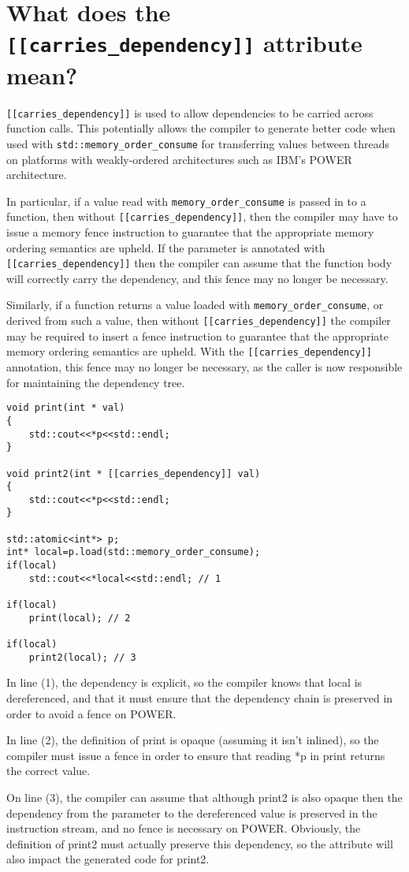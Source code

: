 \section{What does the \texttt{[[carries_dependency]]} attribute mean?}

\texttt{[[carries_dependency]]} is used to allow dependencies to be carried across function calls. This potentially allows the compiler to generate better code when used with \texttt{std::memory_order_consume} for transferring values between threads on platforms with weakly-ordered architectures such as IBM's POWER architecture.

In particular, if a value read with \texttt{memory_order_consume} is passed in to a function, then without \texttt{[[carries_dependency]]}, then the compiler may have to issue a memory fence instruction to guarantee that the appropriate memory ordering semantics are upheld. If the parameter is annotated with \texttt{[[carries_dependency]]} then the compiler can assume that the function body will correctly carry the dependency, and this fence may no longer be necessary.

Similarly, if a function returns a value loaded with \texttt{memory_order_consume}, or derived from such a value, then without \texttt{[[carries_dependency]]} the compiler may be required to insert a fence instruction to guarantee that the appropriate memory ordering semantics are upheld. With the \texttt{[[carries_dependency]]} annotation, this fence may no longer be necessary, as the caller is now responsible for maintaining the dependency tree.

\begin{verbatim}
void print(int * val)
{
    std::cout<<*p<<std::endl;
}

void print2(int * [[carries_dependency]] val)
{
    std::cout<<*p<<std::endl;
}

std::atomic<int*> p;
int* local=p.load(std::memory_order_consume);
if(local)
    std::cout<<*local<<std::endl; // 1

if(local)
    print(local); // 2

if(local)
    print2(local); // 3
\end{verbatim}

In line (1), the dependency is explicit, so the compiler knows that local is dereferenced, and that it must ensure that the dependency chain is preserved in order to avoid a fence on POWER.

In line (2), the definition of print is opaque (assuming it isn't inlined), so the compiler must issue a fence in order to ensure that reading *p in print returns the correct value.

On line (3), the compiler can assume that although print2 is also opaque then the dependency from the parameter to the dereferenced value is preserved in the instruction stream, and no fence is necessary on POWER. Obviously, the definition of print2 must actually preserve this dependency, so the attribute will also impact the generated code for print2.